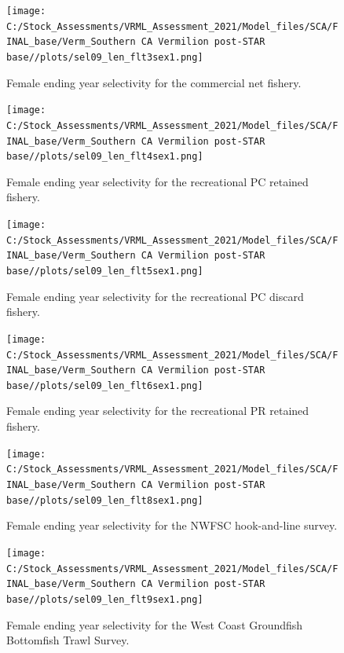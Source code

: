 \documentclass[
  english,
  a4paper,
]{article}
\begin{document}
\begin{figure}
\centering
\texttt{[image: C:/Stock\_Assessments/VRML\_Assessment\_2021/Model\_files/SCA/FINAL\_base/Verm\_Southern CA Vermilion post-STAR base//plots/sel09\_len\_flt3sex1.png]}
\caption{Female ending year selectivity for the commercial net fishery.\label{fig:endyr-selex-COM-NET}}
\end{figure}

\begin{figure}
\centering
\texttt{[image: C:/Stock\_Assessments/VRML\_Assessment\_2021/Model\_files/SCA/FINAL\_base/Verm\_Southern CA Vermilion post-STAR base//plots/sel09\_len\_flt4sex1.png]}
\caption{Female ending year selectivity for the recreational PC retained fishery.\label{fig:endyr-selex-REC-PC}}
\end{figure}

\begin{figure}
\centering
\texttt{[image: C:/Stock\_Assessments/VRML\_Assessment\_2021/Model\_files/SCA/FINAL\_base/Verm\_Southern CA Vermilion post-STAR base//plots/sel09\_len\_flt5sex1.png]}
\caption{Female ending year selectivity for the recreational PC discard fishery.\label{fig:endyr-selex-REC-PC-DIS}}
\end{figure}

\begin{figure}
\centering
\texttt{[image: C:/Stock\_Assessments/VRML\_Assessment\_2021/Model\_files/SCA/FINAL\_base/Verm\_Southern CA Vermilion post-STAR base//plots/sel09\_len\_flt6sex1.png]}
\caption{Female ending year selectivity for the recreational PR retained fishery.\label{fig:endyr-selex-REC-PR}}
\end{figure}

\begin{figure}
\centering
\texttt{[image: C:/Stock\_Assessments/VRML\_Assessment\_2021/Model\_files/SCA/FINAL\_base/Verm\_Southern CA Vermilion post-STAR base//plots/sel09\_len\_flt8sex1.png]}
\caption{Female ending year selectivity for the NWFSC hook-and-line survey.\label{fig:endyr-selex-NWFSC-HKL}}
\end{figure}

\begin{figure}
\centering
\texttt{[image: C:/Stock\_Assessments/VRML\_Assessment\_2021/Model\_files/SCA/FINAL\_base/Verm\_Southern CA Vermilion post-STAR base//plots/sel09\_len\_flt9sex1.png]}
\caption{Female ending year selectivity for the West Coast Groundfish Bottomfish Trawl Survey.\label{fig:endyr-selex-NWFSC-TWL}}
\end{figure}
\end{document}
